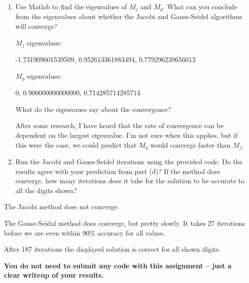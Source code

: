 \documentclass{article}
\begin{document}
\begin{enumerate}
\begin{enumerate}
\begin{mdframed}[style=MyFrame]
And what are the infinity norms of these matrices?

\begin{equation*}
\Vert M_{j} \Vert_{\infty} = |.9| + |0| + |1| = 1.9
\end{equation*}

\begin{equation*}
\Vert M_{g} \Vert_{\infty} = |0| + |9| + |.1| = 9.1
\end{equation*}
The value for Gauss-Seidel is a bit larger than that of the Jacobi, but neither seem significant. I do not think we can make any conclusions about the convergence of the algorithms from this.
\end{mdframed}

\item Use Matlab to find the eigenvalues of $M_j$ and $M_g$. What can you conclude from the eigenvalues about whether the Jacobi and Gauss-Seidel algorithms will converge? \newline

\begin{mdframed}[style=MyFrame]

$M_j$ eigenvalues:

  -1.731909601539509,
   0.952613361883494,
   0.779296239656013

$M_g$ eigenvalues:

                   0,
   0.900000000000000,
   0.714285714285714

What do the eigenvaues say about the convergence?

After some research, I have heard that the rate of convergence can be dependent on the largest eigenvalue. I'm not sure when this applies, but if this were the case, we could predict that $M_g$ would converge faster than $M_j$.

\end{mdframed}

\item Run the Jacobi and Gauss-Seidel iterations using the provided code. Do the results agree with your prediction from part (d)? If the method does converge, how many iterations does it take for the solution to be accurate to all the digits shown? \newline
\end{enumerate}

\begin{mdframed}[style=MyFrame]
The Jacobi method does not converge.

The Gauss-Seidal method does converge, but pretty slowly. It takes 27 iterations before we are even within 90\% accuracy for all values.

After 187 iterations the displayed solution is correct for all shown digits.

\end{mdframed}

{\bf You do not need to submit any code with this assignment -- just a clear writeup of your results.}
\end{enumerate}
\end{document}
